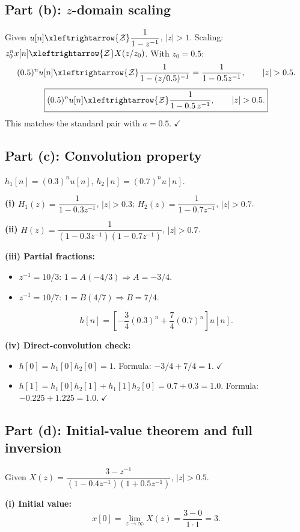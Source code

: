 \documentclass[11pt]{article}
\newcommand{\zt}{\xleftrightarrow{\mathcal{Z}}}
\begin{document}
\subsection*{Part (b): $z$-domain scaling}
Given $u[n]\zt\dfrac{1}{1-z^{-1}}$, $|z|>1$. Scaling: $z_0^{n}x[n]\zt X(z/z_0)$. With $z_0=0.5$:
\[
(0.5)^{n}u[n]\zt \frac{1}{1-(z/0.5)^{-1}}=\frac{1}{1-0.5z^{-1}}, \qquad |z|>0.5.
\]
\begin{equation*}
\boxed{(0.5)^{n}u[n]\zt\dfrac{1}{1-0.5\,z^{-1}}, \qquad |z|>0.5.}
\end{equation*}
This matches the standard pair with $a=0.5.\;\checkmark$

\subsection*{Part (c): Convolution property}
$h_1[n]=(0.3)^{n}u[n]$, $h_2[n]=(0.7)^{n}u[n]$.

\textbf{(i)} $H_1(z)=\dfrac{1}{1-0.3z^{-1}}$, $|z|>0.3$; $H_2(z)=\dfrac{1}{1-0.7z^{-1}}$, $|z|>0.7$.

\textbf{(ii)} $H(z)=\dfrac{1}{(1-0.3z^{-1})(1-0.7z^{-1})}$, $|z|>0.7$.

\textbf{(iii) Partial fractions:}
\begin{itemize}[leftmargin=*]
\item $z^{-1}=10/3$: $1=A(-4/3)\Rightarrow A=-3/4$.
\item $z^{-1}=10/7$: $1=B(4/7)\Rightarrow B=7/4$.
\end{itemize}
\begin{equation*}
\boxed{h[n]=\left[-\dfrac{3}{4}(0.3)^{n}+\dfrac{7}{4}(0.7)^{n}\right]u[n].}
\end{equation*}

\textbf{(iv) Direct-convolution check:}
\begin{itemize}[leftmargin=*]
\item $h[0]=h_1[0]h_2[0]=1$. Formula: $-3/4+7/4=1.\;\checkmark$
\item $h[1]=h_1[0]h_2[1]+h_1[1]h_2[0]=0.7+0.3=1.0$. Formula: $-0.225+1.225=1.0.\;\checkmark$
\end{itemize}

\subsection*{Part (d): Initial-value theorem and full inversion}
Given $X(z)=\dfrac{3-z^{-1}}{(1-0.4z^{-1})(1+0.5z^{-1})}$, $|z|>0.5$.

\textbf{(i) Initial value:}
\begin{equation*}
\boxed{x[0]=\lim_{z\to\infty}X(z)=\dfrac{3-0}{1\cdot 1}=3.}
\end{equation*}
\end{document}
